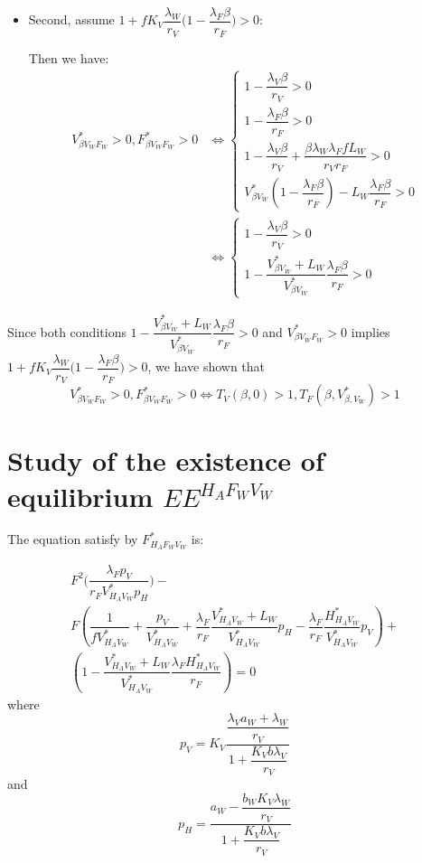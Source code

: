 \documentclass{article}
\newcommand{\lfw}{\lambda_{F}}
\newcommand{\lvw}{\lambda_{V}}
\newcommand{\lfv}{\lambda_{W}}
\begin{document}
\begin{appendices}
\begin{itemize}
\item Second, assume $1 + f K_V \dfrac{\lfv}{r_V} \Big(1 - \dfrac{\lfw \beta}{r_F}\Big) > 0$:

Then we have:
\begin{align*}
V^*_{\beta V_WF_W} > 0, F^*_{\beta V_WF_W} > 0 &\Leftrightarrow \left\lbrace \begin{array}{l}
1 - \dfrac{\lvw \beta}{r_V} > 0 \\
1 - \dfrac{\lfw \beta}{r_F} > 0 \\
1 - \dfrac{\lvw \beta}{r_V} + \dfrac{\beta \lfv \lfw f L_W}{r_V r_F} > 0 \\
V^*_{\beta V_W} (1 - \dfrac{\lfw \beta}{r_F} ) - L_W \dfrac{\lfw \beta}{r_F} > 0
\end{array} \right. \\
& \Leftrightarrow \left\lbrace \begin{array}{l}
1 - \dfrac{\lvw \beta}{r_V} > 0 \\
1 - \dfrac{V^*_{\beta V_W} + L_W}{V^*_{\beta V_W}} \dfrac{\lfw \beta}{r_F} > 0
\end{array} \right.
\end{align*}
\end{itemize}

Since both conditions $1 - \dfrac{V^*_{\beta V_W} + L_W}{V^*_{\beta V_W}} \dfrac{\lfw \beta}{r_F} > 0$ and $V^*_{\beta V_WF_W} > 0$ implies $1 + f K_V \dfrac{\lfv}{r_V} \Big(1 - \dfrac{\lfw \beta}{r_F}\Big) > 0$, we have shown that 
$$V^*_{\beta V_WF_W} > 0, F^*_{\beta V_WF_W} > 0 \Leftrightarrow T_V(\beta, 0)>1, T_F(\beta, V^*_{\beta, V_W}) > 1 $$


\section{Study of the existence of equilibrium $EE^{H_AF_WV_W}$ \label{appendix:equilibriumHAFWVW:existence}}


The equation satisfy by $F^*_{H_AF_WV_W}$ is:

\begin{multline}
F^2 \Big(\dfrac{\lfw p_V}{r_F V^*_{H_AV_W} p_H} \Big) - \\
F \left(\dfrac{1}{fV^*_{H_AV_W}} + \dfrac{p_V}{V^*_{H_AV_W}} + \dfrac{\lfw}{r_F} \dfrac{V^*_{H_AV_W} + L_W}{V^*_{H_AV_W}}p_H - \dfrac{\lfw}{r_F} \dfrac{H^*_{H_AV_W}}{V^*_{H_AV_W}}p_V\right) + \\
 \left(1 - \dfrac{V^*_{H_AV_W} + L_W}{V^*_{H_AV_W}} \dfrac{\lfw H^*_{H_AV_W}}{r_F} \right) = 0
\label{equilibreHAFWVW:equationFW}
\end{multline}
where 
$$ p_V = K_V \dfrac{\dfrac{\lvw a_W + \lfv}{r_V}}{1 + \dfrac{K_V b \lvw}{r_V}}$$
and
$$p_H = \dfrac{a_W - \dfrac{b_W K_V \lfv}{r_V}}{1 + \dfrac{K_V b \lvw}{r_V}}$$



\end{appendices}
\end{document}
